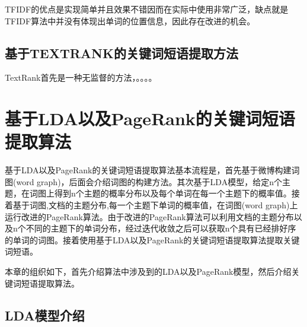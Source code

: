 \documentclass[master]{njuthesis}
\begin{document}
    TFIDF的优点是实现简单并且效果不错因而在实际中使用非常广泛，缺点就是TFIDF算法中并没有体现出单词的位置信息，因此存在改进的机会。

\subsection{基于TEXTRANK的关键词短语提取方法}

    TextRank首先是一种无监督的方法，。。。。


\section{基于LDA以及PageRank的关键词短语提取算法}

    基于LDA以及PageRank的关键词短语提取算法基本流程是，首先基于微博构建词图(word graph)，后面会介绍词图的构建方法。其次基于LDA模型，给定n个主题，在词图上得到n个主题的概率分布以及每个单词在每一个主题下的概率值。接着基于词图,文档的主题分布,每一个主题下单词的概率值，在词图(word graph)上运行改进的PageRank算法。由于改进的PageRank算法可以利用文档的主题分布以及n个不同的主题下的单词分布，经过迭代收敛之后可以获取n个具有已经排好序的单词的词图。接着使用基于LDA以及PageRank的关键词短语提取算法提取关键词短语。
    
    本章的组织如下，首先介绍算法中涉及到的LDA以及PageRank模型，然后介绍关键词短语提取算法。

\subsection{LDA模型介绍}
\end{document}
